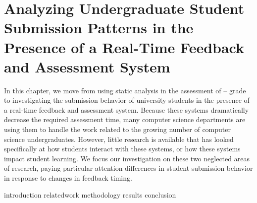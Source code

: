\chapter{Analyzing Undergraduate Student Submission Patterns in the Presence of
  a Real-Time Feedback and Assessment System}
\label{chap:feedback}

\def\currentprefix{feedback}

In this chapter, we move from using static analysis in the assessment of
-- grade  to investigating the submission behavior of
university students in the presence of a real-time feedback and assessment
system. Because these systems dramatically decrease the required assessment
time, many computer science departments are using them to handle the work
related to the growing number of computer science undergraduates. However,
little research is available that has looked specifically at how students
interact with these systems, or how these systems impact student learning. We
focus our investigation on these two neglected areas of research, paying
particular attention differences in student submission behavior in response to
changes in feedback timing.

\iffull
{introduction}
{relatedwork}
{methodology}
{results}
{conclusion}
\fi
